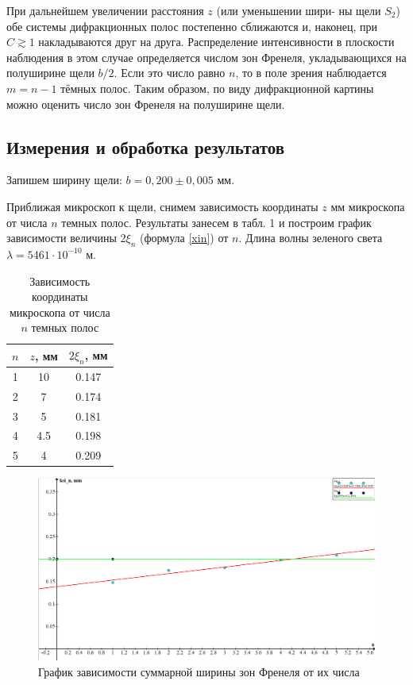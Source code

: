 \documentclass[15pt,a5paper,reqno]{article}
\begin{document}
При дальнейшем увеличении расстояния $ z $ (или уменьшении шири-
ны щели $ S_2 $) обе системы дифракционных полос постепенно сближаются и, наконец, при $ C \gtrsim 1 $ накладываются друг на друга. Распределение интенсивности в плоскости наблюдения в этом случае определяется
числом зон Френеля, укладывающихся на полуширине щели $ b/2 $. Если это число равно $ n $, то в поле зрения наблюдается $ m = n - 1 $ тёмных полос. Таким образом, по виду дифракционной картины можно оценить
число зон Френеля на полуширине щели.

\subsection{Измерения и обработка результатов}

Запишем ширину щели: $ b = 0,200 \pm 0,005 $ мм. 

Приближая микроскоп к щели, снимем зависимость координаты $z $ мм микроскопа от числа $ n $ темных полос.
\newline
Результаты занесем в табл. 1 и построим график зависимости величины $ 2\xi_n $ (формула \eqref{xin}) от $ n $. Длина волны зеленого света $ \lambda = 5461 \cdot 10^{-10} $ м. 

\begin{table}[h!]
\caption{Зависимость координаты микроскопа от числа $ n $ темных полос}
\begin{center}
	\begin{tabular}{|c|c|c|}
		\hline
		$ n $ & $ z $, мм & $ 2\xi_n $, мм\\
		\hline
		1 & 10 & 0.147 \\
	    \hline
		2 & 7 & 0.174 \\
		\hline
		3 & 5 & 0.181 \\
		\hline
		4 & 4.5 & 0.198 \\
		\hline
		5 & 4 & 0.209 \\
		\hline
	\end{tabular}
\end{center}
\label{}
\end{table}

\begin{figure}[h!]
	\label{graf_a}
	\includegraphics[scale=0.47]{pics/graph1.png}
	\caption{График зависимости суммарной ширины зон Френеля от их числа}
\end{figure}
\end{document}
